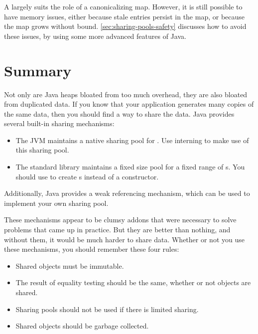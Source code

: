 A  largely suits the role of a canonicalizing map. However, it is
still possible to have memory issues, either because stale entries persist in
the map, or because the map grows without bound.
\autoref{sec:sharing-pools-safety} discusses how to avoid these issues, by using
some more advanced features of Java.

\section{Summary} 

Not only are Java heaps bloated from too much overhead, they
are also bloated from duplicated data. If you know that your application
generates many copies of the same data, then you should find a way to share the
data. Java provides several built-in sharing mechanisms:

\begin{itemize}
  \item The JVM maintains a native sharing
  pool for . Use  interning to make use of this
  sharing pool.
  \item The standard library maintains a fixed size pool for
   a fixed range of  s. You should use  to create
   s instead of a constructor.
\end{itemize}
Additionally, Java provides a weak referencing mechanism, which can be used to
implement your own sharing pool.

These mechanisms appear to be clumsy addons that were necessary to solve
problems that came up in practice. But they are better than nothing, and
without them, it would be much harder to share data. 
Whether or not you use these mechanisms, you should remember these four rules:
\begin{itemize}
  \item Shared objects must be immutable.
  \item The result of equality testing should be the same, whether or
not objects are shared.  
  \item Sharing pools should not be used if there is limited sharing.
  \item Shared objects should be garbage collected.
\end{itemize}





